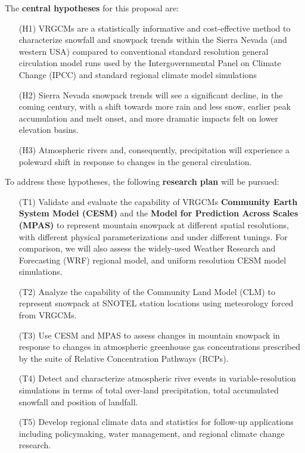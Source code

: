 \documentclass[11pt]{article}
\begin{document}
\noindent The \textbf{central hypotheses} for this proposal are:
\begin{itemize}
\item[(H1)] VRGCMs are a statistically informative and cost-effective method to characterize snowfall and snowpack trends within the Sierra Nevada (and western USA) compared to conventional standard resolution general circulation model runs used by the Intergovernmental Panel on Climate Change (IPCC) and standard regional climate model simulations
\item[(H2)] Sierra Nevada snowpack trends will see a significant decline, in the coming century, with a shift towards more rain and less snow, earlier peak accumulation and melt onset, and more dramatic impacts felt on lower elevation basins.
\item[(H3)] Atmospheric rivers and, consequently, precipitation will experience a poleward shift in response to changes in the general circulation.
\end{itemize}

\noindent To address these hypotheses, the following \textbf{research plan} will be pursued:
\begin{itemize}
\item[(T1)] Validate and evaluate the capability of VRGCMs \textbf{Community Earth System Model (CESM)} and the \textbf{Model for Prediction Across Scales (MPAS)} to represent mountain snowpack at different spatial resolutions, with different physical parameterizations and under different tunings.  For comparison, we will also assess the widely-used Weather Research and Forecasting (WRF) regional model, and uniform resolution CESM model simulations.
\item[(T2)] Analyze the capability of the Community Land Model (CLM) to represent snowpack at SNOTEL station locations using meteorology forced from VRGCMs.
\item[(T3)] Use CESM and MPAS to assess changes in mountain snowpack in response to changes in atmospheric greenhouse gas concentrations prescribed by the suite of Relative Concentration Pathways (RCPs).
\item[(T4)] Detect and characterize atmospheric river events in variable-resolution simulations in terms of total over-land precipitation, total accumulated snowfall and position of landfall.
\item[(T5)] Develop regional climate data and statistics for follow-up applications including policymaking, water management, and regional climate change research.
\end{itemize}
\end{document}
